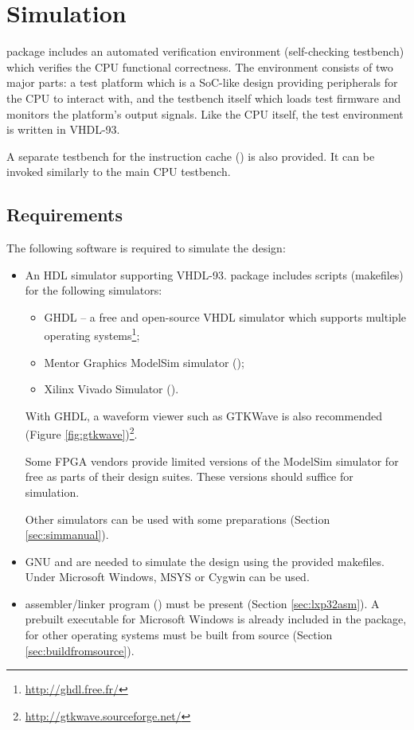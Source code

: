 \documentclass[a4paper,12pt,twoside,extrafontsizes]{memoir}
\begin{document}
\chapter{Simulation}
\label{ch:simulation}

\lxp{} package includes an automated verification environment (self-checking testbench) which verifies the \lxp{} CPU functional correctness. The environment consists of two major parts: a test platform which is a SoC-like design providing peripherals for the CPU to interact with, and the testbench itself which loads test firmware and monitors the platform's output signals. Like the CPU itself, the test environment is written in VHDL-93.

A separate testbench for the instruction cache () is also provided. It can be invoked similarly to the main CPU testbench.

\section{Requirements}

The following software is required to simulate the \lxp{} design:

\begin{itemize}
	\item An HDL simulator supporting VHDL-93. \lxp{} package includes scripts (makefiles) for the following simulators:
	
	\begin{itemize}
		\item GHDL -- a free and open-source VHDL simulator which supports multiple operating systems\footnote{\url{http://ghdl.free.fr/}};
		\item Mentor Graphics\textregistered{} ModelSim\textregistered{} simulator ();
		\item Xilinx\textregistered{} Vivado\textregistered{} Simulator ().
	\end{itemize}
	
	With GHDL, a waveform viewer such as GTKWave is also recommended (Figure \ref{fig:gtkwave})\footnote{\url{http://gtkwave.sourceforge.net/}}.
	
	Some FPGA vendors provide limited versions of the ModelSim\textregistered{} simulator for free as parts of their design suites. These versions should suffice for \lxp{} simulation.
	
	Other simulators can be used with some preparations (Section \ref{sec:simmanual}).
	
	\item GNU  and  are needed to simulate the design using the provided makefiles. Under Microsoft\textregistered{} Windows\textregistered{}, MSYS or Cygwin can be used.
	\item \lxp{} assembler/linker program () must be present (Section \ref{sec:lxp32asm}). A prebuilt executable for Microsoft\textregistered{} Windows\textregistered{} is already included in the \lxp{} package, for other operating systems  must be built from source (Section \ref{sec:buildfromsource}).
\end{itemize}
\end{document}
